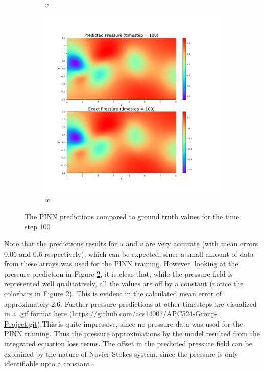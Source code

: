 \begin{figure}[!ht]
\begin{subfigure}{.3\textwidth}
        \caption{$ v $}
        \label{fig:result v}
    \end{subfigure}
    \begin{subfigure}{.3\textwidth}
        \centering
        \includegraphics[width=\linewidth]{Figures/p_100.png}
        \caption{$w$}
        \label{fig:result p}
    \end{subfigure}
    \caption{The PINN predictions compared to ground truth values for the time step 100}
    \label{fig:PINN Results}
\end{figure}


\noindent Note that the predictions results for $u$ and $v$ are very accurate (with mean errors 0.06 and 0.6 respectively), which can be expected, since a small amount of data from these arrays was used for the PINN training. However, looking at the pressure prediction in Figure \ref{fig:result p}, it is clear that, while the pressure field is represented well qualitatively, all the values are off by a constant (notice the colorbars in Figure \ref{fig:result p}). This is evident in the calculated mean error of approximately 2.6. Further pressure predictions at other timesteps are visualized in a .gif format here (\url{https://github.com/acs14007/APC524-Group-Project.git}).This is quite impressive, since no pressure data was used for the PINN training. Thus the pressure approximations by the model resulted from the integrated equation loss terms. The offset in the predicted pressure field can be explained by the nature of Navier-Stokes system, since the pressure is only identifiable upto a constant \cite{Raissi2019}.










